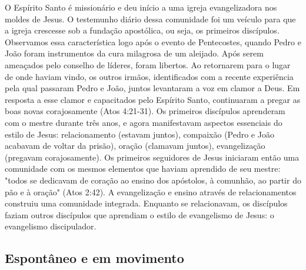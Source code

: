 \documentclass[12pt]{abntex2}
\begin{document}
O Espírito Santo é missionário e deu início a uma igreja evangelizadora nos moldes de Jesus. O testemunho diário dessa comunidade foi um veículo para que a igreja crescesse \cite[p. 78]{stott} sob a fundação apostólica, ou seja, os primeiros discípulos. Observamos essa característica logo após o evento de Pentecostes, quando Pedro e João foram instrumentos da  cura milagrosa de um aleijado. Após serem ameaçados pelo conselho de líderes, foram libertos. Ao retornarem para o lugar de onde haviam vindo, os outros irmãos, identificados com a recente experiência pela qual passaram Pedro e João, juntos levantaram a voz em clamor a Deus. Em resposta a esse clamor e capacitados pelo Espírito Santo, continuaram a pregar as boas novas corajosamente (Atos 4:21-31). Os primeiros discípulos aprenderam com o mestre durante três anos, e agora manifestavam aspectos essenciais do estilo de Jesus: relacionamento (estavam juntos), compaixão (Pedro e João acabavam de voltar da prisão), oração (clamavam juntos), evangelização (pregavam corajosamente). Os primeiros seguidores de Jesus iniciaram então uma comunidade com os mesmos elementos que haviam aprendido de seu mestre: "todos se dedicavam de coração ao ensino dos apóstolos, à comunhão, ao partir do pão e à oração" (Atos 2:42). A evangelização e ensino através de relacionamentos construiu uma comunidade integrada. Enquanto se relacionavam, os discípulos faziam outros discípulos que aprendiam o estilo de evangelismo de Jesus: o evangelismo discipulador.



\subsection{Espontâneo e em movimento}
\end{document}
